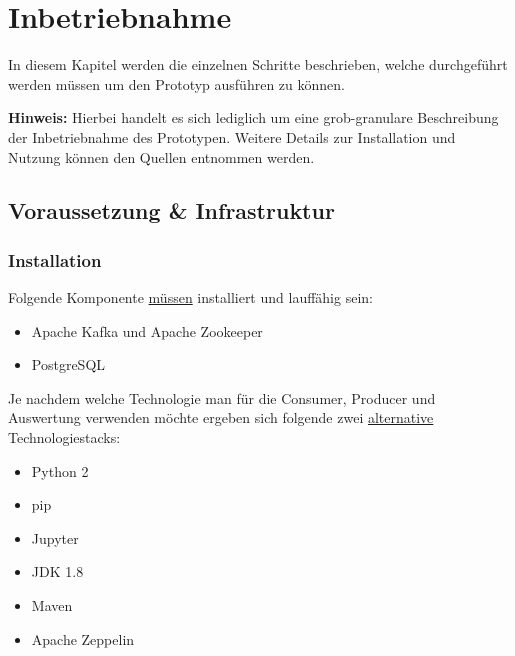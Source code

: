 \chapter{Inbetriebnahme}
\label{chap:betrieb}
In diesem Kapitel werden die einzelnen Schritte beschrieben, welche durchgeführt werden müssen um den Prototyp ausführen zu können.

\textbf{Hinweis:}
\newline
Hierbei handelt es sich lediglich um eine grob-granulare Beschreibung der Inbetriebnahme des Prototypen.
Weitere Details zur Installation und Nutzung können den Quellen entnommen werden.

\section{Voraussetzung \& Infrastruktur}
\subsection{Installation}
Folgende Komponente \underline{müssen}  installiert und lauffähig sein:
\begin{itemize}
  \item Apache Kafka und Apache Zookeeper
  \item PostgreSQL
\end{itemize}


Je nachdem welche Technologie man für die Consumer, Producer und Auswertung verwenden möchte ergeben sich folgende zwei \underline{alternative} Technologiestacks:
\setlength{\columnseprule}{1pt}
\def\columnseprulecolor{\color{black}}
\begin{multicols}{2}
	\begin{itemize}
		\item Python 2
		\item pip
		\item Jupyter
	\end{itemize}
\columnbreak
	\begin{itemize}
		\item JDK 1.8
		\item Maven
		\item Apache Zeppelin
	\end{itemize}
\end{multicols}

